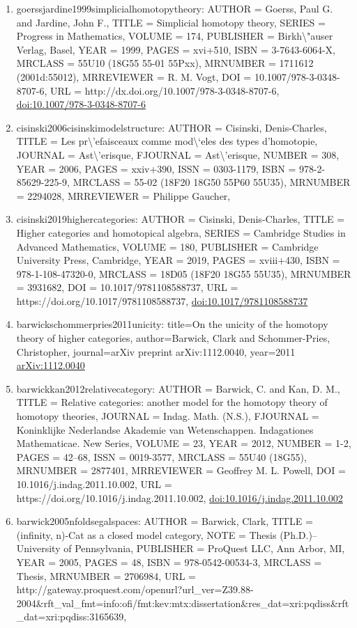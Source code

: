 \documentclass[11pt]{article}
\begin{document}
\begin{enumerate}[leftmargin=*]
  \item goerssjardine1999simplicialhomotopytheory: AUTHOR = Goerss, Paul G. and Jardine, John F., TITLE = Simplicial homotopy theory, SERIES = Progress in Mathematics, VOLUME = 174, PUBLISHER = Birkh\textbackslash{}"auser Verlag, Basel, YEAR = 1999, PAGES = xvi+510, ISBN = 3-7643-6064-X, MRCLASS = 55U10 (18G55 55-01 55Pxx), MRNUMBER = 1711612 (2001d:55012), MRREVIEWER = R. M. Vogt, DOI = 10.1007/978-3-0348-8707-6, URL = http://dx.doi.org/10.1007/978-3-0348-8707-6, \href{https://doi.org/10.1007/978-3-0348-8707-6}{doi:10.1007/978-3-0348-8707-6}
  \item cisinski2006cisinskimodelstructure: AUTHOR = Cisinski, Denis-Charles, TITLE = Les pr\textbackslash{}'efaisceaux comme mod\textbackslash{}`eles des types d'homotopie, JOURNAL = Ast\textbackslash{}'erisque, FJOURNAL = Ast\textbackslash{}'erisque, NUMBER = 308, YEAR = 2006, PAGES = xxiv+390, ISSN = 0303-1179, ISBN = 978-2-85629-225-9, MRCLASS = 55-02 (18F20 18G50 55P60 55U35), MRNUMBER = 2294028, MRREVIEWER = Philippe Gaucher,
  \item cisinski2019highercategories: AUTHOR = Cisinski, Denis-Charles, TITLE = Higher categories and homotopical algebra, SERIES = Cambridge Studies in Advanced Mathematics, VOLUME = 180, PUBLISHER = Cambridge University Press, Cambridge, YEAR = 2019, PAGES = xviii+430, ISBN = 978-1-108-47320-0, MRCLASS = 18D05 (18F20 18G55 55U35), MRNUMBER = 3931682, DOI = 10.1017/9781108588737, URL = https://doi.org/10.1017/9781108588737, \href{https://doi.org/10.1017/9781108588737}{doi:10.1017/9781108588737}
  \item barwickschommerpries2011unicity: title=On the unicity of the homotopy theory of higher categories, author=Barwick, Clark and Schommer-Pries, Christopher, journal=arXiv preprint arXiv:1112.0040, year=2011 \href{https://arxiv.org/abs/1112.0040}{arXiv:1112.0040}
  \item barwickkan2012relativecategory: AUTHOR = Barwick, C. and Kan, D. M., TITLE = Relative categories: another model for the homotopy theory of homotopy theories, JOURNAL = Indag. Math. (N.S.), FJOURNAL = Koninklijke Nederlandse Akademie van Wetenschappen. Indagationes Mathematicae. New Series, VOLUME = 23, YEAR = 2012, NUMBER = 1-2, PAGES = 42--68, ISSN = 0019-3577, MRCLASS = 55U40 (18G55), MRNUMBER = 2877401, MRREVIEWER = Geoffrey M. L. Powell, DOI = 10.1016/j.indag.2011.10.002, URL = https://doi.org/10.1016/j.indag.2011.10.002, \href{https://doi.org/10.1016/j.indag.2011.10.002}{doi:10.1016/j.indag.2011.10.002}
  \item barwick2005nfoldsegalspaces: AUTHOR = Barwick, Clark, TITLE = (infinity, n)-Cat as a closed model category, NOTE = Thesis (Ph.D.)--University of Pennsylvania, PUBLISHER = ProQuest LLC, Ann Arbor, MI, YEAR = 2005, PAGES = 48, ISBN = 978-0542-00534-3, MRCLASS = Thesis, MRNUMBER = 2706984, URL = http://gateway.proquest.com/openurl?url\_ver=Z39.88-2004\&rft\_val\_fmt=info:ofi/fmt:kev:mtx:dissertation\&res\_dat=xri:pqdiss\&rft\_dat=xri:pqdiss:3165639,

\end{enumerate}
\end{document}
